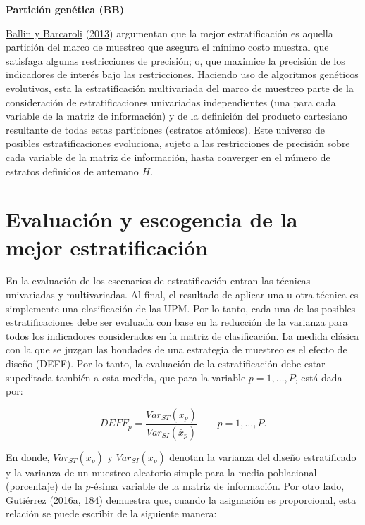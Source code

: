 \documentclass[
  12pt,
  spanish,
]{book}
\begin{document}
\textbf{Partición genética (BB)}

\protect\hyperlink{ref-Ballin_Barcaroli_2013}{Ballin y Barcaroli} (\protect\hyperlink{ref-Ballin_Barcaroli_2013}{2013}) argumentan que la mejor estratificación es aquella partición del marco de muestreo que asegura el mínimo costo muestral que satisfaga algunas restricciones de precisión; o, que maximice la precisión de los indicadores de interés bajo las restricciones. Haciendo uso de algoritmos genéticos evolutivos, esta la estratificación multivariada del marco de muestreo parte de la consideración de estratificaciones univariadas independientes (una para cada variable de la matriz de información) y de la definición del producto cartesiano resultante de todas estas particiones (estratos atómicos). Este universo de posibles estratificaciones evoluciona, sujeto a las restricciones de precisión sobre cada variable de la matriz de información, hasta converger en el número de estratos definidos de antemano \(H\).

\hypertarget{evaluaciuxf3n-y-escogencia-de-la-mejor-estratificaciuxf3n}{%
\section{Evaluación y escogencia de la mejor estratificación}\label{evaluaciuxf3n-y-escogencia-de-la-mejor-estratificaciuxf3n}}

En la evaluación de los escenarios de estratificación entran las técnicas univariadas y multivariadas. Al final, el resultado de aplicar una u otra técnica es simplemente una clasificación de las UPM. Por lo tanto, cada una de las posibles estratificaciones debe ser evaluada con base en la reducción de la varianza para todos los indicadores considerados en la matriz de clasificación. La medida clásica con la que se juzgan las bondades de una estrategia de muestreo es el efecto de diseño (DEFF). Por lo tanto, la evaluación de la estratificación debe estar supeditada también a esta medida, que para la variable \(p = 1, \ldots, P\), está dada por:

\[
DEFF_p = \frac{Var_{ST}(\bar x _p)}{Var_{SI}(\bar x _p)} \ \ \ \ \ \ \ \ \ p = 1, \ldots, P.
\]

En donde, \(Var_{ST}(\bar x _p)\) y \(Var_{SI}(\bar x _p)\) denotan la varianza del diseño estratificado y la varianza de un muestreo aleatorio simple para la media poblacional (porcentaje) de la \(p\)-ésima variable de la matriz de información. Por otro lado, \protect\hyperlink{ref-Gutierrez_2016}{Gutiérrez} (\protect\hyperlink{ref-Gutierrez_2016}{2016a, 184}) demuestra que, cuando la asignación es proporcional, esta relación se puede escribir de la siguiente manera:
\end{document}
